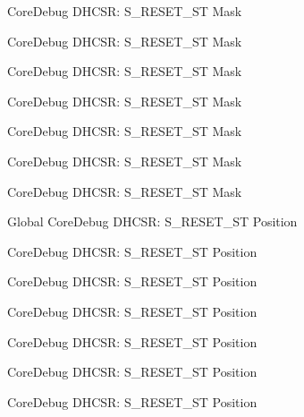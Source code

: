 \begin{DoxyRefList}
\label{deprecated__deprecated000110}%
%
Core\+Debug DHCSR\+: S\+\_\+\+RESET\+\_\+\+ST Mask 

\label{deprecated__deprecated000382}%
%
Core\+Debug DHCSR\+: S\+\_\+\+RESET\+\_\+\+ST Mask 

\label{deprecated__deprecated000164}%
%
Core\+Debug DHCSR\+: S\+\_\+\+RESET\+\_\+\+ST Mask 

\label{deprecated__deprecated000306}%
%
Core\+Debug DHCSR\+: S\+\_\+\+RESET\+\_\+\+ST Mask 

\label{deprecated__deprecated000249}%
%
Core\+Debug DHCSR\+: S\+\_\+\+RESET\+\_\+\+ST Mask 

\label{deprecated__deprecated000563}%
%
Core\+Debug DHCSR\+: S\+\_\+\+RESET\+\_\+\+ST Mask 

\label{deprecated__deprecated000461}%
%
Core\+Debug DHCSR\+: S\+\_\+\+RESET\+\_\+\+ST Mask  
\item[Global \doxylink{group___c_m_s_i_s___core_debug_ga6f934c5427ea057394268e541fa97753}{Core\+Debug\+\_\+\+DHCSR\+\_\+\+S\+\_\+\+RESET\+\_\+\+ST\+\_\+\+Pos} ]\label{deprecated__deprecated000009}%
%
Core\+Debug DHCSR\+: S\+\_\+\+RESET\+\_\+\+ST Position 

\label{deprecated__deprecated000460}%
%
Core\+Debug DHCSR\+: S\+\_\+\+RESET\+\_\+\+ST Position 

\label{deprecated__deprecated000305}%
%
Core\+Debug DHCSR\+: S\+\_\+\+RESET\+\_\+\+ST Position 

\label{deprecated__deprecated000381}%
%
Core\+Debug DHCSR\+: S\+\_\+\+RESET\+\_\+\+ST Position 

\label{deprecated__deprecated000109}%
%
Core\+Debug DHCSR\+: S\+\_\+\+RESET\+\_\+\+ST Position 

\label{deprecated__deprecated000248}%
%
Core\+Debug DHCSR\+: S\+\_\+\+RESET\+\_\+\+ST Position 

\label{deprecated__deprecated000163}%
%
Core\+Debug DHCSR\+: S\+\_\+\+RESET\+\_\+\+ST Position 


\end{DoxyRefList}
